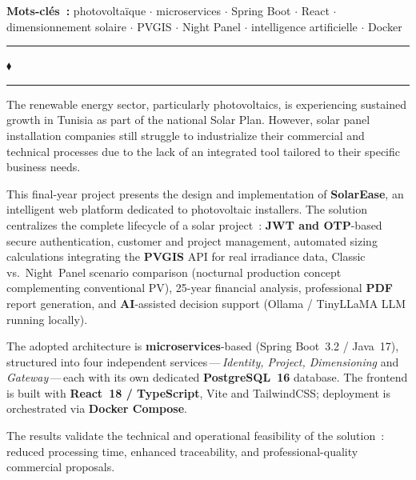 \vspace{4pt}
\noindent\small\textbf{Mots-clés~:}
\textcolor{isetblue}{photovoltaïque} $\cdot$
\textcolor{isetblue}{microservices} $\cdot$
\textcolor{isetblue}{Spring Boot} $\cdot$
\textcolor{isetblue}{React} $\cdot$
\textcolor{isetblue}{dimensionnement solaire} $\cdot$
\textcolor{isetblue}{PVGIS} $\cdot$
\textcolor{isetblue}{Night Panel} $\cdot$
\textcolor{isetblue}{intelligence artificielle} $\cdot$
\textcolor{isetblue}{Docker}

\vspace{16pt}
\begin{center}
  \textcolor{isetgold}{\rule{0.15\textwidth}{0.6pt}}
  \enspace\textcolor{isetblue!40}{\small$\blacklozenge$}\enspace
  \textcolor{isetgold}{\rule{0.15\textwidth}{0.6pt}}
\end{center}
\vspace{12pt}

\begin{tcolorbox}[
  enhanced, breakable,
  colback=sectionbg, colframe=isetgold,
  arc=5pt, boxrule=0.8pt,
  attach boxed title to top left={yshift=-2mm, xshift=8mm},
  boxed title style={
    colback=isetgold, colframe=isetgold,
    arc=3pt, boxrule=0pt,
    fontupper=\bfseries\color{white}
  },
  title={Abstract},
  left=10pt, right=10pt, top=10pt, bottom=10pt
]
\setlength{\parskip}{4pt}
The renewable energy sector, particularly photovoltaics, is experiencing
sustained growth in Tunisia as part of the national Solar Plan. However, solar
panel installation companies still struggle to industrialize their commercial
and technical processes due to the lack of an integrated tool tailored to their
specific business needs.

This final-year project presents the design and implementation of
\textbf{SolarEase}, an intelligent web platform dedicated to photovoltaic
installers. The solution centralizes the complete lifecycle of a solar
project~: \textbf{JWT and OTP}-based secure authentication, customer and
project management, automated sizing calculations integrating the \textbf{PVGIS}
API for real irradiance data, Classic vs.~Night~Panel scenario comparison (nocturnal production concept
complementing conventional PV), 25-year financial analysis, professional \textbf{PDF} report
generation, and \textbf{AI}-assisted decision support (Ollama / TinyLLaMA LLM
running locally).

The adopted architecture is \textbf{microservices}-based (Spring Boot~3.2 /
Java~17), structured into four independent services\,---\,\textit{Identity,
Project, Dimensioning} and \textit{Gateway}\,---\,each with its own dedicated
\textbf{PostgreSQL~16} database. The frontend is built with
\textbf{React~18 / TypeScript}, Vite and TailwindCSS; deployment is
orchestrated via \textbf{Docker Compose}.

The results validate the technical and operational feasibility of the solution~:
reduced processing time, enhanced traceability, and professional-quality
commercial proposals.
\end{tcolorbox}

